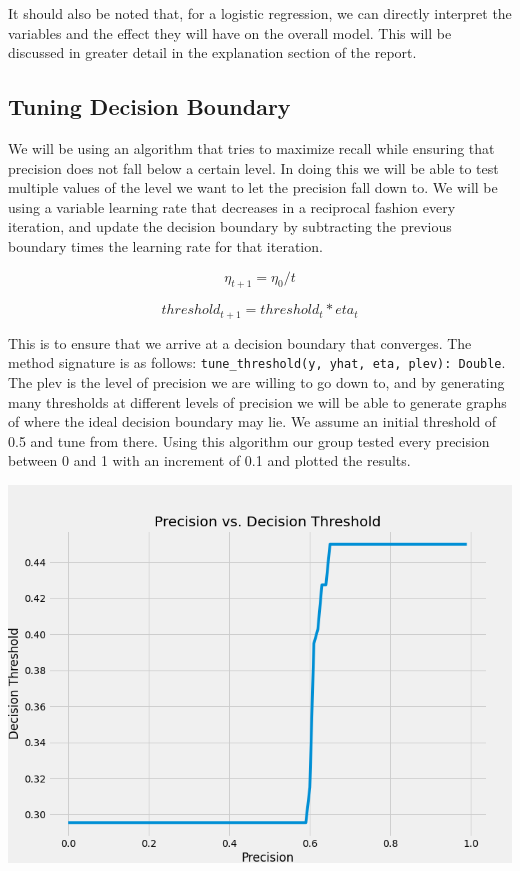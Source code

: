 \documentclass[12pt]{article}
\begin{document}
	It should also be noted that, for a logistic regression, we can directly interpret the variables and the effect they will have on the overall model. This will be discussed in greater detail in the explanation section of the report.

	\subsection{Tuning Decision Boundary}
	
	We will be using an algorithm that tries to maximize recall while ensuring that precision does not fall below a certain level. In doing this we will be able to test multiple values of the level we want to let the precision fall down to. We will be using a variable learning rate that decreases in a reciprocal fashion every iteration, and update the decision boundary by subtracting the previous boundary times the learning rate for that iteration. 
	
	$$ \eta_{t+1} = \eta_0/t $$ 
	
	$$ threshold_{t+1} = threshold_t*eta_t $$
	
	This is to ensure that we arrive at a decision boundary that converges. The method signature is as follows: \verb|tune_threshold(y, yhat, eta, plev): Double|. The plev is the level of precision we are willing to go down to, and by generating many thresholds at different levels of precision we will be able to generate graphs of where the ideal decision boundary may lie. We assume an initial threshold of 0.5 and tune from there. Using this algorithm our group tested every precision between 0 and 1 with an increment of 0.1 and plotted the results. 
	
	\begin{center}
		\includegraphics[scale = 0.4]{../notebooks/precisionvsthreshold.png}
	\end{center}
	
\end{document}
